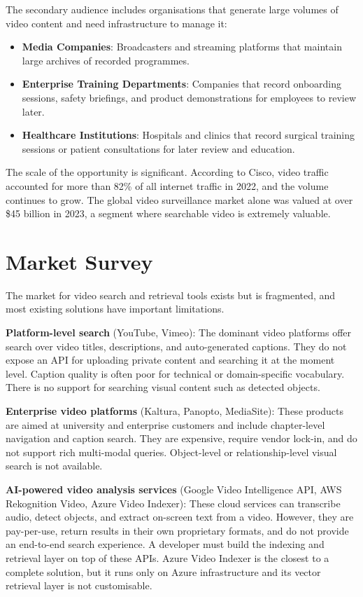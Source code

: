 \documentclass[12pt, a4paper]{report}
\begin{document}
The secondary audience includes organisations that generate large volumes
of video content and need infrastructure to manage it:

\begin{itemize}
  \item \textbf{Media Companies}: Broadcasters and streaming platforms that
    maintain large archives of recorded programmes.

  \item \textbf{Enterprise Training Departments}: Companies that record
    onboarding sessions, safety briefings, and product demonstrations for
    employees to review later.

  \item \textbf{Healthcare Institutions}: Hospitals and clinics that record
    surgical training sessions or patient consultations for later review
    and education.
\end{itemize}

The scale of the opportunity is significant. According to Cisco, video traffic
accounted for more than 82\% of all internet traffic in 2022, and the volume
continues to grow. The global video surveillance market alone was valued at
over \$45 billion in 2023, a segment where searchable video is extremely valuable.

\section{Market Survey}

The market for video search and retrieval tools exists but is fragmented, and
most existing solutions have important limitations.

\textbf{Platform-level search} (YouTube, Vimeo): The dominant video platforms
offer search over video titles, descriptions, and auto-generated captions.
They do not expose an API for uploading private content and searching it
at the moment level. Caption quality is often poor for technical or domain-specific
vocabulary. There is no support for searching visual content such as detected
objects.

\textbf{Enterprise video platforms} (Kaltura, Panopto, MediaSite): These
products are aimed at university and enterprise customers and include
chapter-level navigation and caption search. They are expensive, require
vendor lock-in, and do not support rich multi-modal queries. Object-level
or relationship-level visual search is not available.

\textbf{AI-powered video analysis services} (Google Video Intelligence API,
AWS Rekognition Video, Azure Video Indexer): These cloud services can
transcribe audio, detect objects, and extract on-screen text from a video.
However, they are pay-per-use, return results in their own proprietary formats,
and do not provide an end-to-end search experience. A developer must build
the indexing and retrieval layer on top of these APIs. Azure Video Indexer
is the closest to a complete solution, but it runs only on Azure infrastructure
and its vector retrieval layer is not customisable.
\end{document}
